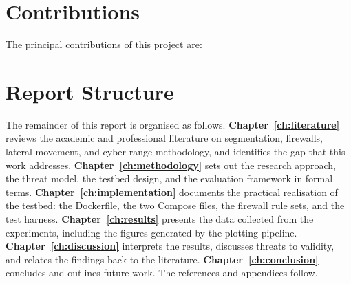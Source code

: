 \section{Contributions}

The principal contributions of this project are:


\section{Report Structure}

The remainder of this report is organised as follows. \textbf{Chapter~\ref{ch:literature}} reviews the academic and professional literature on segmentation, firewalls, lateral movement, and cyber-range methodology, and identifies the gap that this work addresses. \textbf{Chapter~\ref{ch:methodology}} sets out the research approach, the threat model, the testbed design, and the evaluation framework in formal terms. \textbf{Chapter~\ref{ch:implementation}} documents the practical realisation of the testbed: the Dockerfile, the two Compose files, the firewall rule sets, and the test harness. \textbf{Chapter~\ref{ch:results}} presents the data collected from the experiments, including the figures generated by the plotting pipeline. \textbf{Chapter~\ref{ch:discussion}} interprets the results, discusses threats to validity, and relates the findings back to the literature. \textbf{Chapter~\ref{ch:conclusion}} concludes and outlines future work. The references and appendices follow.
